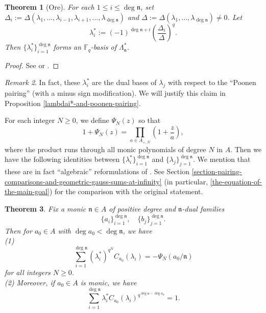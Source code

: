 \documentclass[11pt]{amsart}
\theoremstyle{plain}
\newtheorem{thm}{Theorem}[subsection]
\theoremstyle{definition}
\theoremstyle{remark}
\newtheorem{rem}[thm]{Remark}
\numberwithin{equation}{section}
\newcommand{\FF}{\mathbb{F}}
\newcommand{\nfk}{\mathfrak{n}}
\newcommand{\Fq}{\FF_q}
\begin{document}
	\begin{thm}[Ore]
		For each $1\leq i \leq \deg\nfk$, set $\Delta_i := \Delta(\lambda_1,\ldots,\lambda_{i-1},\lambda_{i+1},\ldots,\lambda_{\deg\nfk})$ and $\Delta := \Delta(\lambda_1,\ldots,\lambda_{\deg\nfk}) \neq 0$. Let
		$$
		\lambda_i^* := (-1)^{\deg\nfk+i} \left(\frac{\Delta_i}{\Delta}\right)^q.
		$$
		Then $\{\lambda_i^*\}_{i=1}^{\deg\nfk}$ forms an $\Fq$-basis of $\Lambda_\nfk^*$.
	\end{thm}
	
	\begin{proof}
		See \cite[]{ore1933special} or \cite[Theorem 1.7.13]{goss1996basic}.
	\end{proof}
	
	\begin{rem}
		In fact, these $\lambda_i^*$ are the dual bases of $\lambda_j$ with respect to the “Poonen pairing” (with a minus sign modification).
		We will justify this claim in Proposition \ref{lambdai*-and-poonen-pairing}.
	\end{rem}
	
	For each integer $N\geq 0$, we define $\Psi_N(z)$ so that
	\begin{equation}      \label{Psi}
		1 + \Psi_N(z)
		= \prod_{a\in A_{+,N}} \left(1+\frac{z}{a}\right),
	\end{equation}
	where the product runs through all monic polynomials of degree $N$ in $A$.
	Then we have the following identities between $\{\lambda_i^*\}_{i=1}^{\deg\nfk}$ and $\{\lambda_j\}_{j=1}^{\deg\nfk}$.
	We mention that these are in fact “algebraic” reformulations of \cite[Theorem 5.4.4]{abp2004determination}.
	See Section \ref{section-pairing-comparisons-and-geometric-gauss-sums-at-infinity} (in particular, \eqref{the-equation-of-the-main-goal}) for the comparison with the original statement.
	
	\begin{thm}  \label{restatement-of-abp-5.4.4}
		Fix a monic $\nfk \in A$ of positive degree and $\nfk$-dual families 
		$$
		\{a_i\}_{i=1}^{\deg\nfk},
		\quad
		\{b_j\}_{j=1}^{\deg\nfk}.
		$$
		Then for $a_0 \in A$ with $\deg a_0 < \deg \nfk$, we have  \\
		(1)
		$$
		\sum_{i=1}^{\deg \nfk} (\lambda_i^*)^{q^N} C_{a_0}(\lambda_i) = -\Psi_N(a_0/\nfk)
		$$
		for all integers $N\geq 0$.   \\
		(2) Moreover, if $a_0 \in A$ is monic, we have
		$$
		\sum_{i=1}^{\deg \nfk} \lambda_i^* C_{a_0}(\lambda_i)^{q^{\deg \nfk - \deg a_0}} = 1.
		$$
	\end{thm}
	
\end{document}
